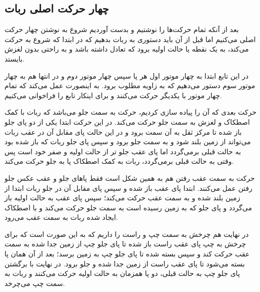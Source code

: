 \subsection{چهار حرکت اصلی ربات}
بعد از آنکه تمام حرکت‌ها را نوشتیم و بدست آوردیم شروع به نوشتن چهار حرکت اصلی می‌کنیم اما قبل از آن باید دستوری به ربات بدهیم که در ابتدا که شروع به حرکت می‌کند، به یک نقطه یا حالت اولیه برود که تعادل داشته باشد و به راحتی بدون لغزش بایستد.

در این تابع ابتدا به چهار موتور اول هر پا سپس چهار موتور دوم و در انتها هم به چهار موتور سوم دستور می‌دهیم که به زاویه مطلوب برود. به اینصورت عمل می‌کند که تمام چهار موتور با یکدیگر حرکت می‌کنند و برای اینکار تابع  را فراخوانی می‌کنیم.

\begin{latin}
	
\end{latin}

حرکت بعدی که آن را پیاده سازی کردیم، حرکت به سمت جلو می‌باشد که ربات با کمک اصطکاک و لغزش به سمت جلو حرکت می‌کند. در این حرکت ابتدا یکی از دو پای جلو باز شده تا مرکز ثقل به آن سمت برود و در این حالت پای مقابل آن در عقب ربات می‌تواند از زمین بلند شود و به سمت جلو برود و سپس پای جلو ربات که باز شده بود به حالت قبلی برمی‌گردد اما پای عقب جلو تر از حالت اولیه و صفر خود است پس وقتی به حالت قبلی برمی‌گردد، ربات به کمک اصطکاک پا به جلو حرکت می‌کند.

\begin{latin}
	
\end{latin}

حرکت به سمت عقب رفتن هم به همین شکل است فقط پاهای جلو و عقب عکس جلو رفتن عمل می‌کنند. ابتدا پای عقب باز شده و سپس پای مقابل آن در جلو ربات ابتدا از زمین بلند شده و به سمت عقب حرکت می‌کند؛ سپس پای عقب به حالت اولیه باز می‌گردد و پای جلو که به زمین رسیده است به سمت جلو حرکت می‌کند و با اصطکاک ایجاد شده ربات به سمت عقب می‌رود.

\begin{latin}
	
\end{latin}

در نهایت هم چرخش به سمت چپ و راست را داریم که به این صورت است که برای چرخش به چپ پای عقب راست باز شده تا پای جلو چپ از زمین جدا شده به سمت عقب حرکت کند و سپس بسته شده تا پای جلو چپ به زمین برسد؛ بعد از آن همان پا بسته می‌شود تا پای عقب راست از زمین جدا شده و جلو برود. در نهایت با برگشتن پای جلو چپ به حالت قبلی، دو پا همزمان به حالت اولیه حرکت می‌کنند و ربات به سمت چپ می‌چرخد.


